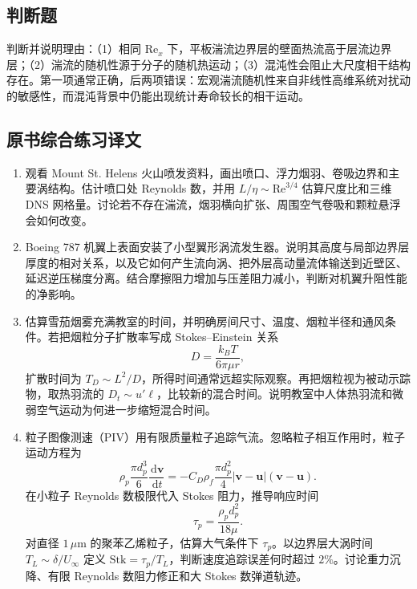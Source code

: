 \documentclass[12pt,a4paper,openany,fontset=none]{ctexbook}
\newcommand{\Rey}{\mathrm{Re}}
\newcommand{\dd}{\,\mathrm d}
\begin{document}
\subsection*{判断题}
判断并说明理由：（1）相同 $\Rey_x$ 下，平板湍流边界层的壁面热流高于层流边界层；（2）湍流的随机性源于分子的随机热运动；（3）混沌性会阻止大尺度相干结构存在。第一项通常正确，后两项错误：宏观湍流随机性来自非线性高维系统对扰动的敏感性，而混沌背景中仍能出现统计寿命较长的相干运动。

\subsection*{原书综合练习译文}
\begin{enumerate}[label=\arabic*.,start=1]
 \item 观看 Mount St. Helens 火山喷发资料，画出喷口、浮力烟羽、卷吸边界和主要涡结构。估计喷口处 Reynolds 数，并用 $L/\eta\sim\Rey^{3/4}$ 估算尺度比和三维 DNS 网格量。讨论若不存在湍流，烟羽横向扩张、周围空气卷吸和颗粒悬浮会如何改变。

 \item Boeing 787 机翼上表面安装了小型翼形涡流发生器。说明其高度与局部边界层厚度的相对关系，以及它如何产生流向涡、把外层高动量流体输送到近壁区、延迟逆压梯度分离。结合摩擦阻力增加与压差阻力减小，判断对机翼升阻性能的净影响。

 \item 估算雪茄烟雾充满教室的时间，并明确房间尺寸、温度、烟粒半径和通风条件。若把烟粒分子扩散率写成 Stokes--Einstein 关系
 \begin{equation}
  D=\frac{k_BT}{6\pi\mu r},
 \end{equation}
 扩散时间为 $T_D\sim L^2/D$，所得时间通常远超实际观察。再把烟粒视为被动示踪物，取热羽流的 $D_t\sim u'\ell$，比较新的混合时间。说明教室中人体热羽流和微弱空气运动为何进一步缩短混合时间。

 \item 粒子图像测速（PIV）用有限质量粒子追踪气流。忽略粒子相互作用时，粒子运动方程为
 \begin{equation}
  \rho_p\frac{\pi d_p^3}{6}\frac{\dd\bm v}{\dd t}
  =-C_D\rho_f\frac{\pi d_p^2}{4}|\bm v-\bm u|(\bm v-\bm u).
 \end{equation}
 在小粒子 Reynolds 数极限代入 Stokes 阻力，推导响应时间
 \begin{equation}
  \tau_p=\frac{\rho_pd_p^2}{18\mu}.
 \end{equation}
 对直径 $1\,\mu\mathrm m$ 的聚苯乙烯粒子，估算大气条件下 $\tau_p$。以边界层大涡时间 $T_L\sim\delta/U_\infty$ 定义 $\mathrm{Stk}=\tau_p/T_L$，判断速度追踪误差何时超过 $2\%$。讨论重力沉降、有限 Reynolds 数阻力修正和大 Stokes 数弹道轨迹。


\end{enumerate}
\end{document}
